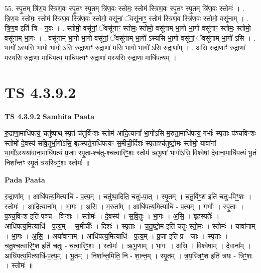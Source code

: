 \documentclass[17pt]{extarticle}
\begin{document}
55. स्पृ॒तम् त्रि॑ण॒व स्त्रि॑ण॒वः स्पृ॒तꣳ स्पृ॒तम् त्रि॑ण॒वः स्तोमः॒ स्तोम॑ स्त्रिण॒वः स्पृ॒तꣳ स्पृ॒तम् त्रि॑ण॒वः स्तोमः॑ । . त्रि॒ण॒वः स्तोमः॒ स्तोम॑ स्त्रिण॒व स्त्रि॑ण॒वः स्तोमो॒ वसू॑नां॒ ॅवसू॑नाꣳ॒॒ स्तोम॑ स्त्रिण॒व स्त्रि॑ण॒वः स्तोमो॒ वसू॑नाम् । . त्रि॒ण॒व इति॑ त्रि - न॒वः । . स्तोमो॒ वसू॑नां॒ ॅवसू॑नाꣳ॒॒ स्तोमः॒ स्तोमो॒ वसू॑नाम् भा॒गो भा॒गो वसू॑नाꣳ॒॒ स्तोमः॒ स्तोमो॒ वसू॑नाम् भा॒गः । . वसू॑नाम् भा॒गो भा॒गो वसू॑नां॒ ॅवसू॑नाम् भा॒गो᳚ ऽस्यसि भा॒गो वसू॑नां॒ ॅवसू॑नाम् भा॒गो॑ ऽसि । . भा॒गो᳚ ऽस्यसि भा॒गो भा॒गो॑ ऽसि रु॒द्राणाꣳ॑ रु॒द्राणा॑ मसि भा॒गो भा॒गो॑ ऽसि रु॒द्राणा᳚म् । . अ॒सि॒ रु॒द्राणाꣳ॑ रु॒द्राणा॑ मस्यसि रु॒द्राणा॒ माधि॑पत्य॒ माधि॑पत्यꣳ रु॒द्राणा॑ मस्यसि रु॒द्राणा॒ माधि॑पत्यम् । \newline
\pagebreak
{}

\section{ TS 4.3.9.2 }

\textbf{TS 4.3.9.2 } \newline
\textbf{Samhita Paata} \newline

रु॒द्राणा॒माधि॑पत्यं॒ चतु॑ष्पाथ् स्पृ॒तं च॑तुर्विꣳ॒॒शः स्तोम॑ आदि॒त्यानां᳚ भा॒गो॑ऽसि म॒रुता॒माधि॑पत्यं॒ गर्भाः᳚ स्पृ॒ताः प॑ञ्चविꣳ॒॒शः स्तोमो॑ दे॒वस्य॑ सवि॒तुर्भा॒गो॑ऽसि॒ बृह॒स्पते॒राधि॑पत्यꣳ स॒मीची॒र्दिशः॑ स्पृ॒ताश्च॑तुष्टो॒मः स्तोमो॒ यावा॑नां भा॒गो᳚ऽस्यया॑वाना॒माधि॑पत्यं प्र॒जाः स्पृ॒ता-श्च॑तु-श्चत्वारिꣳ॒॒शः स्तोम॑ ऋभू॒णां भा॒गो॑ऽसि॒ विश्वे॑षां दे॒वाना॒माधि॑पत्यं भू॒तं निशा᳚न्तꣳ स्पृ॒तं त्र॑यस्त्रिꣳ॒॒शः स्तोमः॑ ॥ \newline

\textbf{Pada Paata} \newline

रु॒द्राणा᳚म् । आधि॑पत्य॒मित्याधि॑ - प॒त्य॒म् । चतु॑ष्पा॒दिति॒ चतुः॑-पा॒त् । स्पृ॒तम् । च॒तु॒र्विꣳ॒॒श इति॑ चतुः-विꣳ॒॒शः । स्तोमः॑ । आ॒दि॒त्याना᳚म् । भा॒गः । अ॒सि॒ । म॒रुता᳚म् । आधि॑पत्य॒मित्याधि॑ - प॒त्य॒म् । गर्भाः᳚ । स्पृ॒ताः । प॒ञ्च॒विꣳ॒॒श इति॑ पञ्च - विꣳ॒॒शः । स्तोमः॑ । दे॒वस्य॑ । स॒वि॒तुः । भा॒गः । अ॒सि॒ । बृह॒स्पतेः᳚ । आधि॑पत्य॒मित्याधि॑ - प॒त्य॒म् । स॒मीचीः᳚ । दिशः॑ । स्पृ॒ताः । च॒तु॒ष्टो॒म इति॑ चतुः-स्तो॒मः । स्तोमः॑ । यावा॑नाम् । भा॒गः । अ॒सि॒ । अया॑वानाम् । आधि॑पत्य॒मित्याधि॑ - प॒त्य॒म् । प्र॒जा इति॑ प्र - जाः । स्पृ॒ताः । च॒तु॒श्च॒त्वा॒रिꣳ॒॒श इति॑ चतुः - च॒त्वा॒रिꣳ॒॒शः । स्तोमः॑ । ऋ॒भू॒णाम् । भा॒गः । अ॒सि॒ । विश्वे॑षाम् । दे॒वाना᳚म् । आधि॑पत्य॒मित्याधि॑-प॒त्य॒म् । भू॒तम् । निशा᳚न्त॒मिति॒ नि - शा॒न्त॒म् । स्पृ॒तम् । त्र॒य॒स्त्रिꣳ॒॒श इति॑ त्रयः - त्रिꣳ॒॒शः । स्तोमः॑ ॥  \newline
\end{document}
